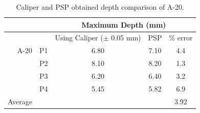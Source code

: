 \begin{table}[htbp]
	\centering
	\caption[Caliper and PSP obtained depth comparison of Angono petroglyph replica]{Caliper and PSP obtained depth comparison of A-20.}
	\begin{tabular}{rrrrr}
		\toprule
		&       & \multicolumn{3}{c}{Maximum Depth (mm)} \\
		\midrule
		&       & \multicolumn{1}{c}{Using Caliper ($\pm$ 0.05 mm)} & \multicolumn{1}{c}{PSP} & \multicolumn{1}{c}{\% error} \\
		A-20 & P1 & \multicolumn{1}{c}{6.80} & \multicolumn{1}{c}{7.10} & \multicolumn{1}{c}{4.4} \\
		& P2 & \multicolumn{1}{c}{8.10} & \multicolumn{1}{c}{8.20} & \multicolumn{1}{c}{1.3} \\
		& P3 & \multicolumn{1}{c}{6.20} & \multicolumn{1}{c}{6.40} & \multicolumn{1}{c}{3.2} \\
		& P4 & \multicolumn{1}{c}{5.45} & \multicolumn{1}{c}{5.82} & \multicolumn{1}{c}{6.9} \\
		\hline
		Average & &  &  & \multicolumn{1}{c}{3.92} \\
		\bottomrule
	\end{tabular}%
	\label{tab:depth}%
\end{table}%

